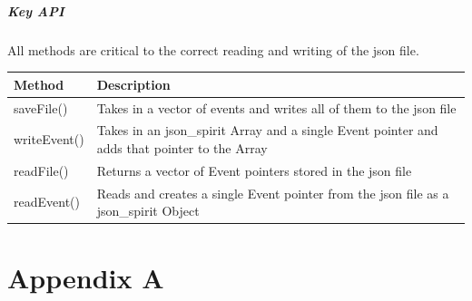 \documentclass[12pt]{extarticle}
\begin{document}
\subparagraph{Key API}All methods are critical to the correct reading and writing of the json file.\\
\begin{tabular}{p{6cm} p{12cm}}
Method & Description\\
\hline
saveFile() & Takes in a vector of events and writes all of them to the json file\\
writeEvent() & Takes in an json\_spirit Array and a single Event pointer and adds that pointer to the Array\\
readFile() & Returns a vector of Event pointers stored in the json file\\
readEvent() & Reads and creates a single Event pointer from the json file as a json\_spirit Object\\
\end{tabular}


\newpage

\section{Appendix A}
\end{document}
